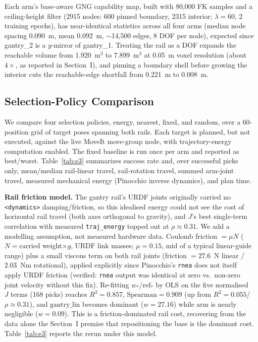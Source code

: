 \documentclass[conference]{IEEEtran}
\begin{document}
Each arm's base-aware GNG capability map, built with 80{,}000 FK
samples and a ceiling-height filter (2915 nodes: 600 pinned boundary, 2315
interior; $\lambda=60$, 2 training epochs), has near-identical statistics across
all four arms (median node spacing 0.090~m, mean 0.092~m, $\sim$14{,}500 edges, 8
DOF per node), expected since gantry\_2 is a $y$-mirror of gantry\_1. Treating
the rail as a DOF expands the reachable volume from 1.920~m$^3$ to 7.899~m$^3$ at
0.05~m voxel resolution (about $4\times$, as reported in Section~I), and pinning a
boundary shell before growing the interior cuts the reachable-edge shortfall from
0.221~m to 0.008~m.

\subsection{Selection-Policy Comparison}

We compare four selection policies, energy, nearest, fixed, and
random, over a 60-position grid of target poses spanning both rails. Each
target is planned, but not executed, against the live MoveIt move-group node,
with trajectory-energy computation enabled. The fixed baseline is run once per
arm and reported as best/worst. Table~\ref{tab:e3} summarizes success rate and, over
successful picks only, mean/median rail-linear travel, rail-rotation travel,
summed arm-joint travel, measured mechanical energy (Pinocchio inverse dynamics),
and plan time.

\textbf{Rail friction model.} The gantry rail's URDF joints
originally carried no \texttt{<dynamics>} damping/friction, so this idealised
energy could not see the cost of horizontal rail travel (both axes orthogonal to
gravity), and $J$'s best single-term correlation with measured
\texttt{traj\_energy} topped out at $\rho\approx0.31$. We add a modelling
assumption, not measured hardware data. Coulomb friction $=\mu N$ ($N=$carried
weight$\times g$, URDF link masses; $\mu=0.15$, mid of a typical linear-guide
range) plus a small viscous term on both rail joints (friction $=27.6$~N linear /
$2.03$~Nm rotational), applied explicitly since Pinocchio's \texttt{rnea} does not
itself apply URDF friction (verified: \texttt{rnea} output was identical at zero
vs.\ non-zero joint velocity without this fix). Re-fitting $w_*$/$\mathrm{ref}_*$
by OLS on the five normalised $J$ terms (168 picks) reaches $R^2=0.857$,
$\mathrm{Spearman}=0.909$ (up from $R^2=0.055$/$\rho\approx0.31$), and
$\mathrm{gantry\_lin}$ becomes dominant ($w=27.16$) while $\mathrm{arm}$ is nearly
negligible ($w=0.09$). This is a friction-dominated rail cost, recovering from the data
alone the Section~I premise that repositioning the base is the dominant cost.
Table~\ref{tab:e3} reports the rerun under this model.
\end{document}
